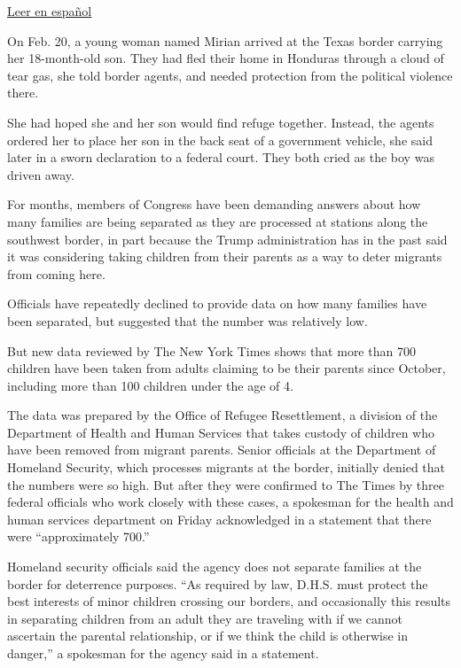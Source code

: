 \href{https://www.nytimes3xbfgragh.onion/es/2018/04/25/menores-migrantes-estados-unidos}{Leer
en español}

On Feb. 20, a young woman named Mirian arrived at the Texas border
carrying her 18-month-old son. They had fled their home in Honduras
through a cloud of tear gas, she told border agents, and needed
protection from the political violence there.

She had hoped she and her son would find refuge together. Instead, the
agents ordered her to place her son in the back seat of a government
vehicle, she said later in a sworn declaration to a federal court. They
both cried as the boy was driven away.

For months, members of Congress have been demanding answers about how
many families are being separated as they are processed at stations
along the southwest border, in part because the Trump administration has
in the past said it was considering taking children from their parents
as a way to deter migrants from coming here.

Officials have repeatedly declined to provide data on how many families
have been separated, but suggested that the number was relatively low.

But new data reviewed by The New York Times shows that more than 700
children have been taken from adults claiming to be their parents since
October, including more than 100 children under the age of 4.

The data was prepared by the Office of Refugee Resettlement, a division
of the Department of Health and Human Services that takes custody of
children who have been removed from migrant parents. Senior officials at
the Department of Homeland Security, which processes migrants at the
border, initially denied that the numbers were so high. But after they
were confirmed to The Times by three federal officials who work closely
with these cases, a spokesman for the health and human services
department on Friday acknowledged in a statement that there were
``approximately 700.''

Homeland security officials said the agency does not separate families
at the border for deterrence purposes. ``As required by law, D.H.S. must
protect the best interests of minor children crossing our borders, and
occasionally this results in separating children from an adult they are
traveling with if we cannot ascertain the parental relationship, or if
we think the child is otherwise in danger,'' a spokesman for the agency
said in a statement.

